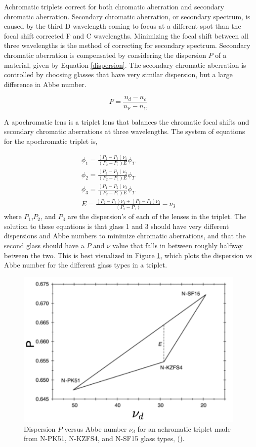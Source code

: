 Achromatic triplets correct for both chromatic aberration and secondary chromatic aberration. Secondary chromatic aberration, or secondary spectrum, is caused by the third D wavelength coming to focus at a different spot than the focal shift corrected F and C wavelengths. Minimizing the focal shift between all three wavelengths is the method of correcting for secondary spectrum. Secondary chromatic aberration is compensated by considering the dispersion $P$ of a material, given by Equation \ref{dispersion}. The secondary chromatic aberration is controlled by choosing glasses that have very similar dispersion, but a large difference in Abbe number. 

\begin{equation}
    P=\frac{n_d-n_c}{n_F-n_C}
    \label{dispersion}
\end{equation}



A apochromatic lens is a triplet lens that balances the chromatic focal shifts and secondary chromatic aberrations at three wavelengths. The system of equations for the apochromatic triplet is,


\begin{eqnarray}
       \phi_1=\frac{(P_2-P_3)\nu_1}{(P_2-P_1)E}\phi_T \\
       \phi_2=\frac{(P_3-P_1)\nu_2}{(P_2-P_1)E}\phi_T \\
       \phi_3=\frac{(P_1-P_2)\nu_3}{(P_2-P_1)E}\phi_T \\
       E=\frac{(P_2-P_3)\nu_1+(P_3-P_1)\nu_2}{(P_2-P_1)}-\nu_3
\end{eqnarray}
where $P_1$,$P_2$, and $P_3$ are the dispersion's of each of the lenses in the triplet. The solution to these equations is that glass 1 and 3 should have very different dispersions and Abbe numbers to minimize chromatic aberrations, and that the second glass should have a $P$ and $\nu$ value that falls in between roughly halfway between the two. This is best visualized in Figure \ref{fig:tripletPV}, which plots the dispersion vs Abbe number for the different glass types in a triplet. 
\begin{figure}
    \centering
    \includegraphics[width=.6\textwidth]{Chapter Materials/Chapter Three Materials/tripletPV.png}
    \caption{Dispersion $P$ versus Abbe number $\nu_d$ for an achromatic triplet made from N-PK51, N-KZFS4, and N-SF15 glass types, (\cite{kingslake2009lens}).} 
    \label{fig:tripletPV}
\end{figure}

